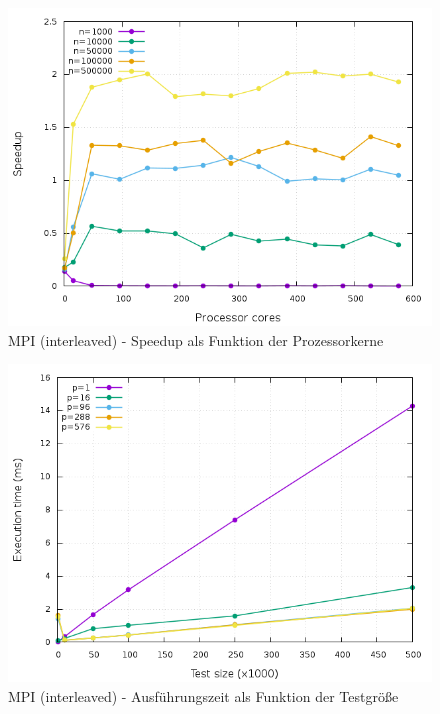 \begin{figure}[p]
	\centering
	\includegraphics[width=404pt]{resources/plots/MPI_Interleaved_sizes.png}
	\caption{MPI (interleaved) - Speedup als Funktion der Prozessorkerne}
	\label{MPI_Interleaved_sizes}
\end{figure}

\begin{figure}[p]
	\centering
	\includegraphics[width=404pt]{resources/plots/MPI_Interleaved_cores.png}
	\caption{MPI (interleaved) - Ausführungszeit als Funktion der Testgröße}
	\label{MPI_Interleaved_cores}
\end{figure}

